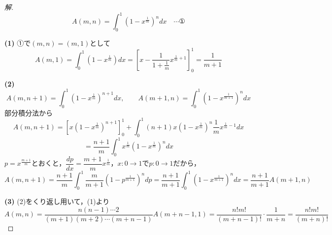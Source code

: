 \documentclass[../main.tex]{subfiles}
\begin{document}
\begin{proof}[解]
  \[
    A(m,n)=\int_0^1\left(1-x^{\frac1m}\right)^ndx \quad\cdots\text{①}
  \]

  \textbf{(1)} ①で$(m,n)=(m,1)$として
  \[
    A(m,1)=\int_0^1\left(1-x^{\frac1m}\right)dx=\left[x-\frac{1}{1+\frac1m}x^{\frac1m+1}\right]_0^1=\frac{1}{m+1}
  \]

  \textbf{(2)}
  \[
    A(m,n+1)=\int_0^1\left(1-x^{\frac1m}\right)^{n+1}dx, \qquad
    A(m+1,n)=\int_0^1\left(1-x^{\frac{1}{m+1}}\right)^ndx
  \]
  部分積分法から
  \[
    A(m,n+1)=\left[x\left(1-x^{\frac1m}\right)^{n+1}\right]_0^1+\int_0^1(n+1)x\left(1-x^{\frac1m}\right)^n\frac1mx^{\frac1m-1}dx
  \]
  \[
    =\frac{n+1}{m}\int_0^1x^{\frac1m}\left(1-x^{\frac1m}\right)^ndx
  \]
  $p=x^{\frac{m+1}{m}}$とおくと，$\dfrac{dp}{dx}=\dfrac{m+1}{m}x^{\frac1m}$，$x:0\to1$で$p:0\to1$だから，
  \[
    A(m,n+1)=\frac{n+1}{m}\int_0^1\frac{m}{m+1}\left(1-p^{\frac{1}{m+1}}\right)^ndp=\frac{n+1}{m+1}\int_0^1\left(1-x^{\frac{1}{m+1}}\right)^ndx=\frac{n+1}{m+1}A(m+1,n)
  \]

  \textbf{(3)} (2)をくり返し用いて，(1)より
  \[
    A(m,n)=\frac{n(n-1)\cdots2}{(m+1)(m+2)\cdots(m+n-1)}A(m+n-1,1)=\frac{n!m!}{(m+n-1)!}\cdot\frac{1}{m+n}=\frac{n!m!}{(m+n)!}
  \]
\end{proof}
\end{document}
